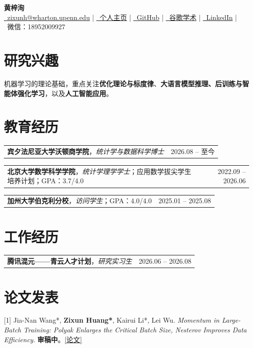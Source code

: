 \documentclass[a4paper,9pt]{extarticle}
\makeatletter
\newcommand{\datedentry}[2]{%
\begin{tabularx}{\linewidth}{@{}X r@{}}
#1 & #2
\end{tabularx}}
\makeatother
\begin{document}
\begin{center}
    {\LARGE \textbf{黄梓洵}}\\[3pt]
    {\small
    \href{mailto:zixunh@wharton.upenn.edu}{\faEnvelope\ zixunh@wharton.upenn.edu} \; | \;
    \href{https://alexhuang13.github.io/}{\faGlobe\ 个人主页} \; | \;
    \href{https://github.com/alexhuang13}{\faGithub\ GitHub} \; | \;
    \href{https://scholar.google.com/citations?user=n7NzBzAAAAAJ}{\faGraduationCap\ 谷歌学术} \; | \;
    \href{https://www.linkedin.com/in/zixun-huang-b80ab4351/}{\faLinkedin\ LinkedIn} \; | \;
    \textcolor{linkcolour}{\faWeixin\ 微信：18952009927}}
\end{center}
\vspace{-9pt}

\section{研究兴趣}
机器学习的理论基础，重点关注\textbf{优化理论与标度律}、\textbf{大语言模型推理、后训练与智能体强化学习}，以及\textbf{人工智能应用}。

\section{教育经历}
\datedentry{\textbf{宾夕法尼亚大学沃顿商学院}，\textit{统计学与数据科学博士}}{2026.08 -- 至今}
\datedentry{\textbf{北京大学数学科学学院}，\textit{统计学理学学士}；应用数学拔尖学生培养计划；GPA：3.7/4.0}{2022.09 -- 2026.06}
\datedentry{\textbf{加州大学伯克利分校}，\textit{访问学生}；GPA：4.0/4.0}{2025.01 -- 2025.08}

\section{工作经历}
\datedentry{\textbf{腾讯混元——青云人才计划}，\textit{研究实习生}}{2026.06 -- 2026.08}

\section{论文发表}
[1] Jia-Nan Wang*, \textbf{Zixun Huang*}, Kairui Li*, Lei Wu. \textit{Momentum in Large-Batch Training: Polyak Enlarges the Critical Batch Size, Nesterov Improves Data Efficiency}. \textbf{审稿中}。\href{https://arxiv.org/pdf/2609.02728}{[论文]}
\end{document}
